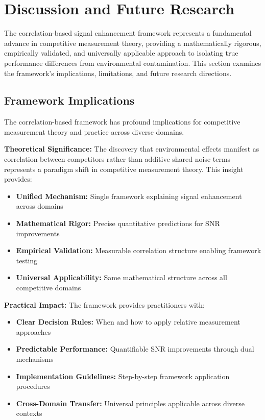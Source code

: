 \section{Discussion and Future Research}

The correlation-based signal enhancement framework represents a fundamental advance in competitive measurement theory, providing a mathematically rigorous, empirically validated, and universally applicable approach to isolating true performance differences from environmental contamination. This section examines the framework's implications, limitations, and future research directions.

\subsection{Framework Implications}

The correlation-based framework has profound implications for competitive measurement theory and practice across diverse domains.

\textbf{Theoretical Significance:}
The discovery that environmental effects manifest as correlation between competitors rather than additive shared noise terms represents a paradigm shift in competitive measurement theory. This insight provides:
\begin{itemize}
    \item \textbf{Unified Mechanism:} Single framework explaining signal enhancement across domains
    \item \textbf{Mathematical Rigor:} Precise quantitative predictions for SNR improvements
    \item \textbf{Empirical Validation:} Measurable correlation structure enabling framework testing
    \item \textbf{Universal Applicability:} Same mathematical structure across all competitive domains
\end{itemize}

\textbf{Practical Impact:}
The framework provides practitioners with:
\begin{itemize}
    \item \textbf{Clear Decision Rules:} When and how to apply relative measurement approaches
    \item \textbf{Predictable Performance:} Quantifiable SNR improvements through dual mechanisms
    \item \textbf{Implementation Guidelines:} Step-by-step framework application procedures
    \item \textbf{Cross-Domain Transfer:} Universal principles applicable across diverse contexts
\end{itemize}

